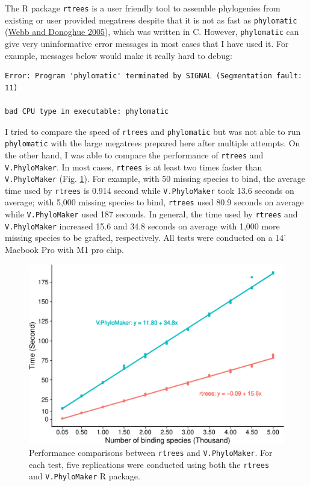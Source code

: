 \documentclass[
  12pt,
]{article}
\begin{document}
The R package \texttt{rtrees} is a user friendly tool to assemble phylogenies from existing or user provided megatrees despite that it is not as fast as \texttt{phylomatic} (\protect\hyperlink{ref-webb2005phylomatic}{Webb and Donoghue 2005}), which was written in C. However, \texttt{phylomatic} can give very uninformative error messages in most cases that I have used it. For example, messages below would make it really hard to debug:

\begin{verbatim}
Error: Program 'phylomatic' terminated by SIGNAL (Segmentation fault: 11)

bad CPU type in executable: phylomatic
\end{verbatim}

I tried to compare the speed of \texttt{rtrees} and \texttt{phylomatic} but was not able to run \texttt{phylomatic} with the large megatrees prepared here after multiple attempts. On the other hand, I was able to compare the performance of \texttt{rtrees} and \texttt{V.PhyloMaker}. In most cases, \texttt{rtrees} is at least two times faster than \texttt{V.PhyloMaker} (Fig. \ref{fig:figSpeed}). For example, with 50 missing species to bind, the average time used by \texttt{rtrees} is 0.914 second while \texttt{V.PhyloMaker} took 13.6 seconds on average; with 5,000 missing species to bind, \texttt{rtrees} used 80.9 seconds on average while \texttt{V.PhyloMaker} used 187 seconds. In general, the time used by \texttt{rtrees} and \texttt{V.PhyloMaker} increased 15.6 and 34.8 seconds on average with 1,000 more missing species to be grafted, respectively. All tests were conducted on a 14' Macbook Pro with M1 pro chip.



\begin{figure}[H]

{\centering \includegraphics{ms_files/figure-latex/figSpeed-1} 

}

\caption{Performance comparisons between \texttt{rtrees} and \texttt{V.PhyloMaker}. For each test, five replications were conducted using both the \texttt{rtrees} and \texttt{V.PhyloMaker} R package.}\label{fig:figSpeed}
\end{figure}
\end{document}
